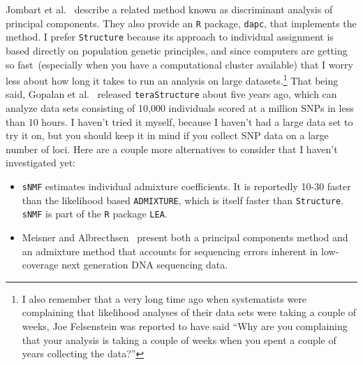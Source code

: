 \documentclass[12pt]{article}
\begin{document}
Jombart et al.~\cite{Jombart-etal-2010} describe a related method
known as discriminant analysis of principal components. They also
provide an {\tt R} package, {\tt dapc}, that implements the
method. I prefer
{\tt Structure} because its approach to individual assignment is based
directly on population genetic principles, and since computers are
getting so fast~(especially when you have a computational cluster
available) that I worry less about how long it takes to run an
analysis on large datasets.\footnote{I also remember that a very long
  time ago when systematists were complaining that likelihood analyses
  of their data sets were taking a couple of weeks, Joe Felsenstein
  was reported to have said ``Why are you complaining that your
  analysis is taking a couple of weeks when you spent a couple of
  years collecting the data?''} That being said, Gopalan et
al.~\cite{Gopalan-etal-2016} released {\tt teraStructure} about five
years ago, which can analyze data sets consisting of 10,000
individuals scored at a million SNPs in less than 10
hours. I haven't tried it
myself, because I haven't had a large data set to try it on, but you
should keep it in mind if you collect SNP data on a large number of
loci. Here are a couple more alternatives to consider that I haven't
investigated yet:

\begin{itemize}

\item {\tt sNMF} estimates individual admixture coefficients. It is
  reportedly 10-30 faster than the likelihood based {\tt ADMIXTURE},
  which is itself faster than {\tt Structure}. {\tt sNMF} is part of
  the {\tt R} package {\tt LEA}.

\item Meisner and Albrecthsen~\cite{Meisner-Albrechtsen-2018} present
  both a principal components method and an admixture method that
  accounts for sequencing errors inherent in low-coverage next
  generation DNA sequencing data.

\end{itemize}




\ccLicense
\end{document}
